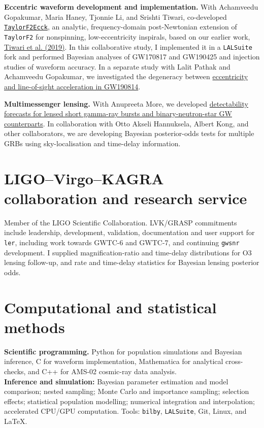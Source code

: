 \documentclass[10pt]{article}
\begin{document}
\textbf{Eccentric waveform development and implementation.} With Achamveedu Gopakumar, Maria Haney, Tjonnie Li, and Srishti Tiwari, co-developed \href{https://arxiv.org/abs/2508.12697}{\texttt{TaylorF2Ecck}}, an analytic, frequency-domain post-Newtonian extension of \texttt{TaylorF2} for nonspinning, low-eccentricity inspirals, based on our earlier work, \href{https://arxiv.org/abs/1905.07956}{Tiwari et al. (2019)}. In this collaborative study, I implemented it in a \texttt{LALSuite} fork and performed Bayesian analyses of GW170817 and GW190425 and injection studies of waveform accuracy. In a separate study with Lalit Pathak and Achamveedu Gopakumar, we investigated the degeneracy between \href{https://arxiv.org/abs/2605.21955}{eccentricity and line-of-sight acceleration in GW190814}.

\textbf{Multimessenger lensing.} With Anupreeta More, we developed \href{https://arxiv.org/abs/2502.02536}{detectability forecasts for lensed short gamma-ray bursts and binary-neutron-star GW counterparts}. In collaboration with Otto Akseli Hannuksela, Albert Kong, and other collaborators, we are developing Bayesian posterior-odds tests for multiple GRBs using sky-localisation and time-delay information.

\section*{LIGO--Virgo--KAGRA collaboration and research service}
Member of the LIGO Scientific Collaboration. LVK/GRASP commitments include leadership, development, validation, documentation and user support for \texttt{ler}, including work towards GWTC-6 and GWTC-7, and continuing \texttt{gwsnr} development. I supplied magnification-ratio and time-delay distributions for O3 lensing follow-up, and rate and time-delay statistics for Bayesian lensing posterior odds.
\section*{Computational and statistical methods}
\textbf{Scientific programming.} Python for population simulations and Bayesian inference, C for waveform implementation, Mathematica for analytical cross-checks, and C++ for AMS-02 cosmic-ray data analysis.\\
\textbf{Inference and simulation:} Bayesian parameter estimation and model comparison; nested sampling; Monte Carlo and importance sampling; selection effects; statistical population modelling; numerical integration and interpolation; accelerated CPU/GPU computation. Tools: \texttt{bilby}, \texttt{LALSuite}, Git, Linux, and \LaTeX.
\newpage
\end{document}
